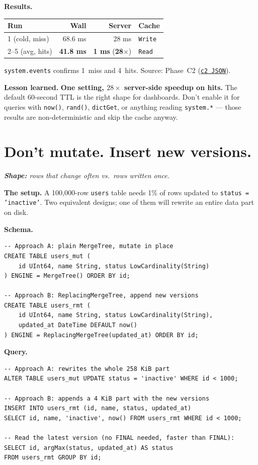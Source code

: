 \documentclass[11pt]{article}
\renewcommand{\arraystretch}{1.15}
\newcommand{\shape}[1]{%
  \par\noindent\textit{\textbf{Shape:} #1}\par\smallskip}
\newcommand{\schemaHd}{%
  \par\smallskip\noindent\textbf{\color{accentblue}Schema.}\par\nopagebreak\smallskip}
\newcommand{\queryHd}{%
  \par\smallskip\noindent\textbf{\color{accentblue}Query.}\par\nopagebreak\smallskip}
\newcommand{\resultsHd}{%
  \par\smallskip\noindent\textbf{\color{accentblue}Results.}\par\nopagebreak\smallskip}
\newcommand{\lesson}[1]{%
  \par\medskip
  \begin{lessonbox}\textbf{\color{accentgreen}Lesson learned.}\enspace #1\end{lessonbox}}
\begin{document}
\resultsHd
\renewcommand{\arraystretch}{1.20}
\begin{tabularx}{\linewidth}{@{}X r r l@{}}
\toprule
\textbf{Run}     & \textbf{Wall} & \textbf{Server} & \textbf{Cache}\\
\midrule
1 (cold, miss)   & 68.6 ms       & 28 ms           & \texttt{Write}\\
\rowcolor{accentgreen!12}2--5 (avg, hits) & \textbf{41.8 ms} & \textbf{1 ms} (\textbf{28$\times$}) & \texttt{Read}\\
\bottomrule
\end{tabularx}

\smallskip
\texttt{system.events} confirms 1~miss and 4~hits. Source: Phase~C2
(\href{run:results/experiment_c2_query_cache_20260503_192130.json}{\texttt{c2 JSON}}).

\lesson{%
\textbf{One setting, $28\times$ server-side speedup on hits.}
The default 60-second TTL is the right shape for dashboards.
Don't enable it for queries with \texttt{now()}, \texttt{rand()},
\texttt{dictGet}, or anything reading \texttt{system.*} — those
results are non-deterministic and skip the cache anyway.}

\section{Don't mutate. Insert new versions.}

\shape{rows that change often vs.\ rows written once.}

\textbf{The setup.}
A 100{,}000-row \texttt{users} table needs 1\% of rows updated to
\texttt{status = 'inactive'}. Two equivalent designs; one of them
will rewrite an entire data part on disk.

\schemaHd
\begin{lstlisting}
-- Approach A: plain MergeTree, mutate in place
CREATE TABLE users_mut (
    id UInt64, name String, status LowCardinality(String)
) ENGINE = MergeTree() ORDER BY id;

-- Approach B: ReplacingMergeTree, append new versions
CREATE TABLE users_rmt (
    id UInt64, name String, status LowCardinality(String),
    updated_at DateTime DEFAULT now()
) ENGINE = ReplacingMergeTree(updated_at) ORDER BY id;
\end{lstlisting}

\queryHd
\begin{lstlisting}
-- Approach A: rewrites the whole 258 KiB part
ALTER TABLE users_mut UPDATE status = 'inactive' WHERE id < 1000;

-- Approach B: appends a 4 KiB part with the new versions
INSERT INTO users_rmt (id, name, status, updated_at)
SELECT id, name, 'inactive', now() FROM users_rmt WHERE id < 1000;

-- Read the latest version (no FINAL needed, faster than FINAL):
SELECT id, argMax(status, updated_at) AS status
FROM users_rmt GROUP BY id;
\end{lstlisting}
\end{document}
